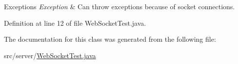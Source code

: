 \begin{DoxyExceptions}{Exceptions}
{\em Exception} & Can throw exceptions because of socket connections. \\
\hline
\end{DoxyExceptions}


Definition at line 12 of file Web\+Socket\+Test.\+java.



The documentation for this class was generated from the following file\+:\begin{DoxyCompactItemize}
\item 
src/server/\hyperlink{_web_socket_test_8java}{Web\+Socket\+Test.\+java}\end{DoxyCompactItemize}
